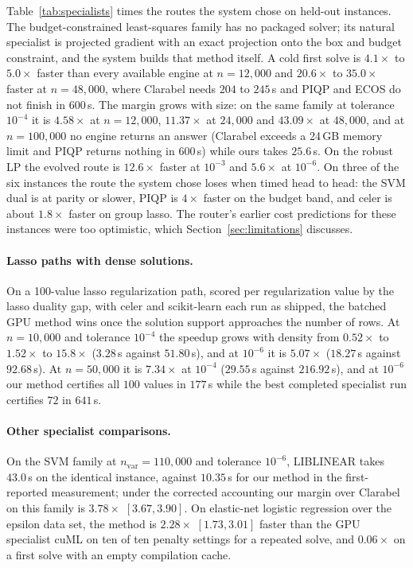 Table~\ref{tab:specialists} times the routes the system chose on held-out
instances. The budget-constrained least-squares family has no packaged solver;
its natural specialist is projected gradient with an exact projection onto the
box and budget constraint, and the system builds that method itself. A cold
first solve is $4.1\times$ to $5.0\times$ faster than every available engine at
$n = 12{,}000$ and $20.6\times$ to $35.0\times$ faster at $n = 48{,}000$, where
Clarabel needs $204$ to $245$\,s and PIQP and ECOS do not finish in $600$\,s. The
margin grows with size: on the same family at tolerance $10^{-4}$ it is
$4.58\times$ at $n = 12{,}000$, $11.37\times$ at $24{,}000$ and $43.09\times$ at
$48{,}000$, and at $n = 100{,}000$ no engine returns an answer (Clarabel exceeds
a 24\,GB memory limit and PIQP returns nothing in $600$\,s) while ours takes
$25.6$\,s. On the robust LP the evolved route is $12.6\times$ faster at
$10^{-3}$ and $5.6\times$ at $10^{-6}$. On three of the six instances the route
the system chose loses when timed head to head: the SVM dual is at parity or slower,
PIQP is $4\times$ faster on the budget band, and celer is about $1.8\times$
faster on group lasso. The router's earlier cost predictions for these
instances were too optimistic, which Section~\ref{sec:limitations} discusses.

\paragraph{Lasso paths with dense solutions.} On a 100-value lasso
regularization path, scored per regularization value by the lasso duality gap,
with celer and scikit-learn each run as shipped, the batched
GPU method wins once the solution support approaches the number of rows. At
$n = 10{,}000$ and tolerance $10^{-4}$ the speedup grows with density from
$0.52\times$ to $1.52\times$ to $15.8\times$ ($3.28$\,s against $51.80$\,s), and
at $10^{-6}$ it is $5.07\times$ ($18.27$\,s against $92.68$\,s). At
$n = 50{,}000$ it is $7.34\times$ at $10^{-4}$ ($29.55$\,s against
$216.92$\,s), and at $10^{-6}$ our method certifies all $100$ values in
$177$\,s while the best completed specialist run certifies $72$ in $641$\,s.

\paragraph{Other specialist comparisons.} On the SVM family at
$n_{\mathrm{var}} = 110{,}000$ and tolerance $10^{-6}$, LIBLINEAR
\citep{Fan2008LIBLINEAR} takes $43.0$\,s on the identical instance, against
$10.35$\,s for our method in the first-reported measurement; under the corrected
accounting our margin over Clarabel on this family is $3.78\times$
$[3.67, 3.90]$. On elastic-net logistic regression over the epsilon data
set, the method is $2.28\times$ $[1.73, 3.01]$ faster than the GPU specialist
cuML \citep{NVIDIA2026cuML} on ten of ten penalty settings for a repeated
solve, and $0.06\times$ on a first solve with an empty compilation cache.

